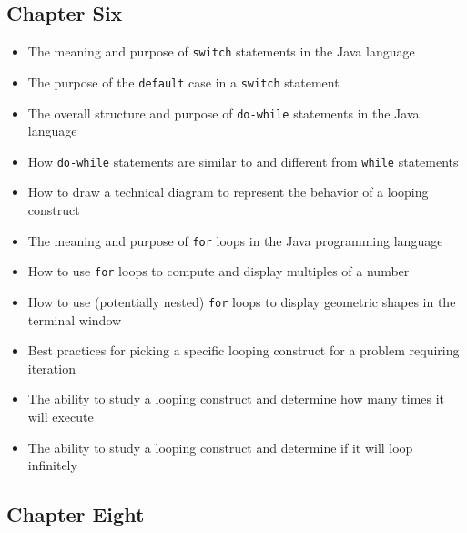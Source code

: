 \documentclass[11pt]{article}
\begin{document}
\subsection*{Chapter Six}

\begin{itemize}

  \itemsep 0in

  \item The meaning and purpose of {\tt switch} statements in the Java language
  \item The purpose of the {\tt default} case in a {\tt switch} statement
  \item The overall structure and purpose of {\tt do-while} statements in the Java language
  \item How {\tt do-while} statements are similar to and different from {\tt while} statements
  \item How to draw a technical diagram to represent the behavior of a looping construct
  \item The meaning and purpose of {\tt for} loops in the Java programming language
  \item How to use {\tt for} loops to compute and display multiples of a number
  \item How to use (potentially nested) {\tt for} loops to display geometric shapes in the terminal window
  \item Best practices for picking a specific looping construct for a problem requiring iteration
  \item The ability to study a looping construct and determine how many times it will execute
  \item The ability to study a looping construct and determine if it will loop
    infinitely

\end{itemize}

\subsection*{Chapter Eight}
\end{document}
